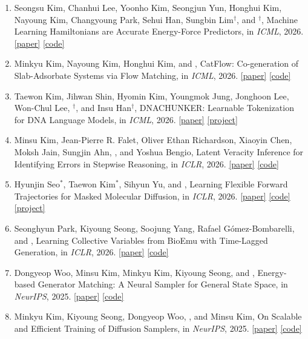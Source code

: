 \begin{enumerate}
\item Seongsu Kim, Chanhui Lee, Yoonho Kim, Seongjun Yun, Honghui Kim, Nayoung Kim, Changyoung Park, Sehui Han, Sungbin Lim$^\dagger$, and $^\dagger$, Machine Learning Hamiltonians are Accurate Energy-Force Predictors, in \textit{ICML}, 2026. \mbox{\href{https://arxiv.org/abs/2602.16897}{[paper]}} \mbox{\href{https://github.com/seongsukim-ml/QHFlow2}{[code]}}
\item Minkyu Kim, Nayoung Kim, Honghui Kim, and , CatFlow: Co-generation of Slab-Adsorbate Systems via Flow Matching, in \textit{ICML}, 2026. \mbox{\href{https://arxiv.org/abs/2602.05372}{[paper]}} \mbox{\href{https://github.com/minkyu1022/CatFlow}{[code]}}
\item Taewon Kim, Jihwan Shin, Hyomin Kim, Youngmok Jung, Jonghoon Lee, Won-Chul Lee, $^\dagger$, and Insu Han$^\dagger$, DNACHUNKER: Learnable Tokenization for DNA Language Models, in \textit{ICML}, 2026. \mbox{\href{https://arxiv.org/abs/2601.03019}{[paper]}} \mbox{\href{https://holymollyhao.github.io/dnachunker/}{[project]}}
\item Minsu Kim, Jean-Pierre R. Falet, Oliver Ethan Richardson, Xiaoyin Chen, Moksh Jain, Sungjin Ahn, , and Yoshua Bengio, Latent Veracity Inference for Identifying Errors in Stepwise Reasoning, in \textit{ICLR}, 2026. \mbox{\href{https://arxiv.org/abs/2505.11824}{[paper]}} \mbox{\href{https://github.com/alstn12088/veracity_inference}{[code]}}
\item Hyunjin Seo$^*$, Taewon Kim$^*$, Sihyun Yu, and , Learning Flexible Forward Trajectories for Masked Molecular Diffusion, in \textit{ICLR}, 2026. \mbox{\href{https://arxiv.org/abs/2505.16790}{[paper]}} \mbox{\href{https://github.com/holymollyhao/MELD}{[code]}} \mbox{\href{https://holymollyhao.github.io/MELD/}{[project]}}
\item Seonghyun Park, Kiyoung Seong, Soojung Yang, Rafael G\'{o}mez-Bombarelli, and , Learning Collective Variables from BioEmu with Time-Lagged Generation, in \textit{ICLR}, 2026. \mbox{\href{https://arxiv.org/abs/2507.07390}{[paper]}} \mbox{\href{https://github.com/seonghyun26/bioemu-cv}{[code]}}
\item Dongyeop Woo, Minsu Kim, Minkyu Kim, Kiyoung Seong, and , Energy-based Generator Matching: A Neural Sampler for General State Space, in \textit{NeurIPS}, 2025. \mbox{\href{https://arxiv.org/abs/2505.19646}{[paper]}} \mbox{\href{https://github.com/dongyeop3813/EGM}{[code]}}
\item Minkyu Kim, Kiyoung Seong, Dongyeop Woo, , and Minsu Kim, On Scalable and Efficient Training of Diffusion Samplers, in \textit{NeurIPS}, 2025. \mbox{\href{https://arxiv.org/abs/2505.19552}{[paper]}} \mbox{\href{https://github.com/minkyu1022/SGDS}{[code]}}

\end{enumerate}
